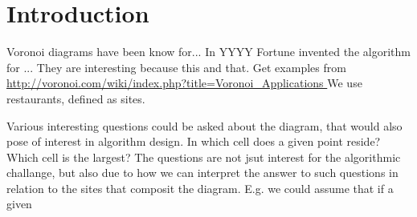 


\setcounter{page}{1}
\section{Introduction}
Voronoi diagrams have been know for... In YYYY Fortune invented the algorithm for ... They are interesting because this and that. Get examples from \url{http://voronoi.com/wiki/index.php?title=Voronoi_Applications } We use restaurants, defined as sites.

Various interesting questions could be asked about the diagram, that would also pose of interest in algorithm design. In which cell does a given point reside? Which cell is the largest? The questions are not jsut interest for the algorithmic challange, but also due to how we can interpret the answer to such questions in relation to the sites that composit the diagram. E.g. we could assume that if a given
